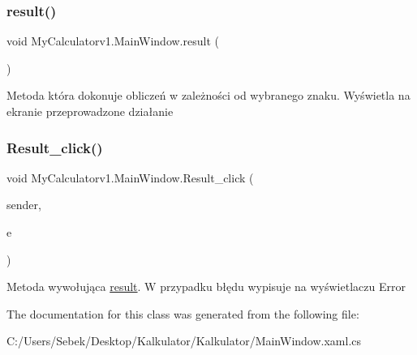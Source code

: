 \subsubsection{\texorpdfstring{result()}{result()}}
{\footnotesize\ttfamily void My\+Calculatorv1.\+Main\+Window.\+result (\begin{DoxyParamCaption}{ }\end{DoxyParamCaption})\hspace{0.3cm}{\ttfamily [private]}}



Metoda która dokonuje obliczeń w zależności od wybranego znaku. Wyświetla na ekranie przeprowadzone działanie 

\mbox{\label{class_my_calculatorv1_1_1_main_window_a6c07df3d7d2ac3eb3218f01a2f3de9c6}} 
\subsubsection{\texorpdfstring{Result\+\_\+click()}{Result\_click()}}
{\footnotesize\ttfamily void My\+Calculatorv1.\+Main\+Window.\+Result\+\_\+click (\begin{DoxyParamCaption}\item[{object}]{sender,  }\item[{Routed\+Event\+Args}]{e }\end{DoxyParamCaption})\hspace{0.3cm}{\ttfamily [private]}}





Metoda wywołująca \mbox{\hyperlink{class_my_calculatorv1_1_1_main_window_ad2ba19ce602b4bd65b01bc3c2e44d853}{result}}. W przypadku błędu wypisuje na wyświetlaczu Error 

The documentation for this class was generated from the following file\+:\begin{DoxyCompactItemize}
\item 
C\+:/\+Users/\+Sebek/\+Desktop/\+Kalkulator/\+Kalkulator/Main\+Window.\+xaml.\+cs\end{DoxyCompactItemize}

